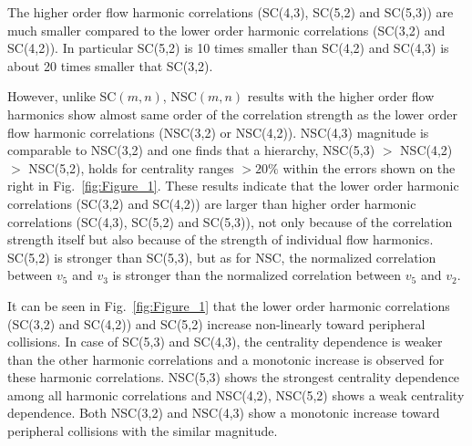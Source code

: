 The higher order flow harmonic correlations (SC(4,3), SC(5,2) and SC(5,3)) are much smaller compared to the lower order harmonic correlations (SC(3,2) and SC(4,2)).
In particular SC(5,2) is 10 times smaller than SC(4,2) and SC(4,3) is about 20 times smaller that SC(3,2).

However, unlike SC$(m,n)$, NSC$(m,n)$ results with the higher order flow harmonics show almost same order of the correlation strength as the lower order flow harmonic correlations (NSC(3,2) or NSC(4,2)).
NSC(4,3) magnitude is comparable to NSC(3,2) and one finds that a hierarchy, NSC(5,3) $>$ NSC(4,2) $>$ NSC(5,2), holds for centrality ranges $>20\%$ within the errors shown on the right in Fig.~\ref{fig:Figure_1}.
These results indicate that the lower order harmonic correlations (SC(3,2) and SC(4,2)) are larger than higher order harmonic correlations (SC(4,3), SC(5,2) and SC(5,3)), not only because of the correlation strength itself but also because of the strength of individual flow harmonics. 
SC(5,2) is stronger than SC(5,3), but as for NSC, the normalized correlation between $v_5$ and $v_3$ is stronger than the normalized correlation between $v_5$ and $v_2$. 

It can be seen in Fig.~\ref{fig:Figure_1} that the lower order harmonic correlations (SC(3,2) and SC(4,2)) and SC(5,2) increase non-linearly toward peripheral collisions.
In case of SC(5,3) and SC(4,3), the centrality dependence is weaker than the other harmonic correlations and a monotonic increase is observed for these harmonic correlations.
NSC(5,3) shows the strongest centrality dependence among all harmonic correlations and NSC(4,2), NSC(5,2) shows a weak centrality dependence.
Both NSC(3,2) and NSC(4,3) show a monotonic increase toward peripheral collisions with the similar magnitude.

